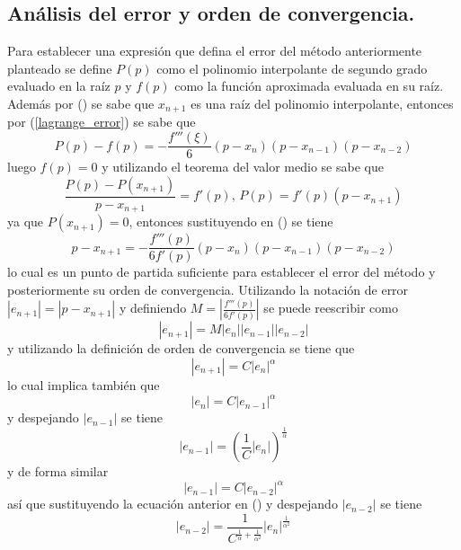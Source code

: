 \subsection{Análisis del error y orden de convergencia.}
Para establecer una expresión que defina el error del método anteriormente planteado se define $P(p)$
como el polinomio interpolante de segundo grado evaluado en la raíz $p$ y $f(p)$ como la función aproximada
evaluada en su raíz. Además por () se sabe que $x_{n+1}$ es una raíz del polinomio
interpolante, entonces por (\ref{lagrange_error}) se sabe que
\begin{equation}
    \label{error_muller_eq1}
    P(p)-f(p)=-\frac{f'''(\xi)}{6}(p-x_n)(p-x_{n-1})(p-x_{n-2})
\end{equation}
luego $f(p)=0$ y utilizando el teorema del valor medio se sabe que 
\[\frac{P(p)-P(x_{n+1})}{p-x_{n+1}}=f'(p),\,P(p)=f'(p)(p-x_{n+1})\]
ya que $P(x_{n+1})=0$, entonces sustituyendo en () se tiene
\begin{equation}
    \label{error_muller_eq2}
    p-x_{n+1}=-\frac{f'''(p)}{6f'(p)}(p-x_n)(p-x_{n-1})(p-x_{n-2})
\end{equation}
lo cual es un punto de partida suficiente para establecer el error del método y 
posteriormente su orden de convergencia. Utilizando la notación de error $|e_{n+1}|=|p-x_{n+1}|$
y definiendo $M=|\frac{f'''(p)}{6f'(p)}|$ se puede reescribir  como
\begin{equation}
    \label{error_muller}
    |e_{n+1}|=M|e_{n}||e_{n-1}||e_{n-2}|
\end{equation}
y utilizando la definición de orden de convergencia se tiene que
\begin{equation}
    \label{error_e0}
    |e_{n+1}|=C|e_n|^\alpha
\end{equation}
lo cual implica también que
\begin{equation}
    \label{error_e1}
    |e_n|=C|e_{n-1}|^\alpha
\end{equation}
y despejando $|e_{n-1}|$ se tiene
\begin{equation}
    \label{error_e2}
    |e_{n-1}|=\left(\frac{1}{C}|e_n|\right)^\frac{1}{\alpha}
\end{equation}
y de forma similar 
\[|e_{n-1}|=C|e_{n-2}|^\alpha\]
así que sustituyendo la ecuación anterior en () y despejando $|e_{n-2}|$ se tiene
\begin{equation}
    \label{error_e3}
    |e_{n-2}|=\frac{1}{C^{\frac{1}{\alpha}+\frac{1}{\alpha^2}}}|e_n|^{\frac{1}{\alpha^2}}
\end{equation}
